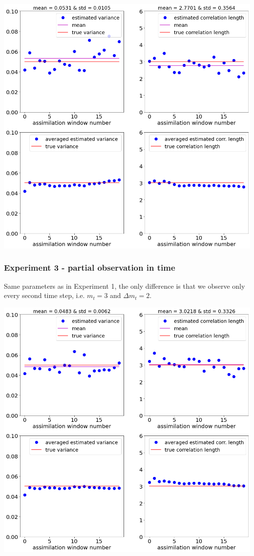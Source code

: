\documentclass[a4paper,10pt]{article}
\numberwithin{equation}{section}
\begin{document}
\includegraphics[scale=0.4]{Ex2}

\newpage
\subsubsection*{Experiment 3 - partial observation in time}
Same parameters as in Experiment 1, the only difference is that we observe only every second time step, i.e. $m_t=3$ and $\Delta m_t=2$.

\includegraphics[scale=0.4]{Ex3}
\end{document}
